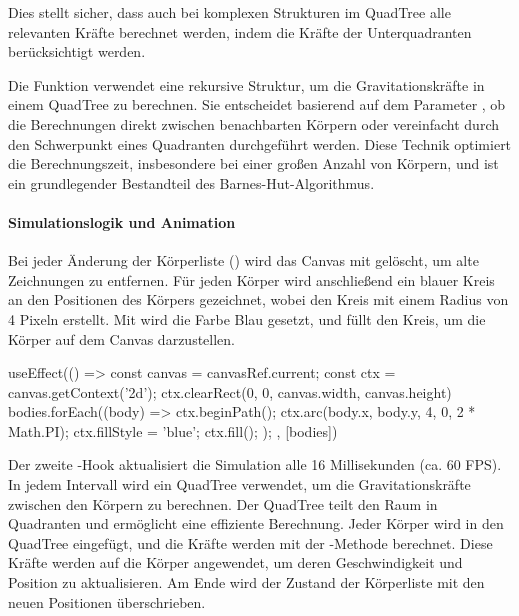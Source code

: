 \documentclass[a4paper,12pt,twoside]{article}
\begin{document}
Dies stellt sicher, dass auch bei komplexen Strukturen im QuadTree alle relevanten Kräfte berechnet werden, indem die Kräfte der Unterquadranten berücksichtigt werden.


Die Funktion  verwendet eine rekursive Struktur, um die Gravitationskräfte in einem QuadTree zu berechnen. Sie entscheidet basierend auf dem Parameter , ob die Berechnungen direkt zwischen benachbarten Körpern oder vereinfacht durch den Schwerpunkt eines Quadranten durchgeführt werden. Diese Technik optimiert die Berechnungszeit, insbesondere bei einer großen Anzahl von Körpern, und ist ein grundlegender Bestandteil des Barnes-Hut-Algorithmus.







\paragraph{Simulationslogik und Animation}

Bei jeder Änderung der Körperliste () wird das Canvas mit  gelöscht, um alte Zeichnungen zu entfernen. Für jeden Körper wird anschließend ein blauer Kreis an den Positionen des Körpers gezeichnet, wobei  den Kreis mit einem Radius von 4 Pixeln erstellt. Mit  wird die Farbe Blau gesetzt, und  füllt den Kreis, um die Körper auf dem Canvas darzustellen.

\begin{javascript}
	useEffect(() => {
        const canvas = canvasRef.current;
        const ctx = canvas.getContext('2d');
        ctx.clearRect(0, 0, canvas.width, canvas.height)
        bodies.forEach((body) => {
            ctx.beginPath();
            ctx.arc(body.x, body.y, 4, 0, 2 * Math.PI);
            ctx.fillStyle = 'blue';
            ctx.fill();
        });
    }, [bodies])
\end{javascript}


Der zweite -Hook aktualisiert die Simulation alle 16 Millisekunden (ca. 60 FPS). In jedem Intervall wird ein QuadTree verwendet, um die Gravitationskräfte zwischen den Körpern zu berechnen. Der QuadTree teilt den Raum in Quadranten und ermöglicht eine effiziente Berechnung. Jeder Körper wird in den QuadTree eingefügt, und die Kräfte werden mit der -Methode berechnet. Diese Kräfte werden auf die Körper angewendet, um deren Geschwindigkeit und Position zu aktualisieren. Am Ende wird der Zustand der Körperliste mit den neuen Positionen überschrieben.
\end{document}
